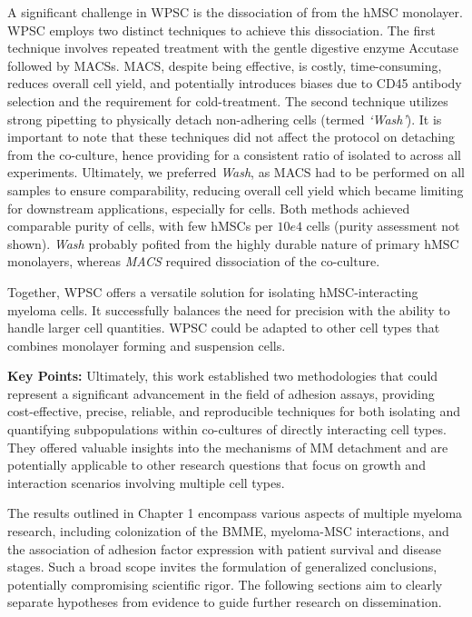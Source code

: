 A significant challenge in \ac{WPSC} is the dissociation of \MAina from the hMSC
monolayer. WPSC employs two distinct techniques to achieve this dissociation.
The first technique involves repeated treatment with the gentle digestive enzyme
Accutase followed by \acp{MACS}. \ac{MACS}, despite being effective, is costly,
time-consuming, reduces overall cell yield, and potentially introduces biases
due to CD45 antibody selection and the requirement for cold-treatment. The
second technique utilizes strong pipetting to physically detach non-adhering
cells (termed \emph{`Wash'}). It is important to note that these techniques did
not affect the protocol on detaching \nMAina from the co-culture, hence
providing for a consistent ratio of isolated \MAina to \nMAina across all
experiments. Ultimately, we preferred \emph{Wash}, as \ac{MACS} had to be performed
on all samples to ensure comparability, reducing overall cell yield which became
limiting for downstream applications, especially for \nMAina cells. Both methods
achieved comparable purity of \MAina cells, with few hMSCs per $10e4$
\MAina cells (purity assessment not shown). \emph{Wash} probably pofited from
the highly durable nature of primary hMSC monolayers, whereas \emph{MACS}
required dissociation of the co-culture.

Together, \ac{WPSC} offers a versatile solution for isolating hMSC-interacting
myeloma cells. It successfully balances the need for precision with the ability
to handle larger cell quantities. \ac{WPSC} could be adapted to other cell types
that combines monolayer forming and suspension cells.



\textbf{Key Points:} Ultimately, this work established two methodologies
that could represent a significant advancement in the field of adhesion assays,
providing cost-effective, precise, reliable, and reproducible techniques for
both isolating and quantifying subpopulations within co-cultures of directly
interacting cell types. They offered valuable insights into the mechanisms of MM
detachment and are potentially applicable to other research questions that focus
on growth and interaction scenarios involving multiple cell types.








%
\label{sec:discussion_framework}%
The results outlined in Chapter 1 encompass various aspects of multiple myeloma
research, including colonization of the \ac{BMME}, myeloma-\ac{MSC}
interactions, and the association of adhesion factor expression with patient
survival and disease stages. Such a broad scope invites the formulation of
generalized conclusions, potentially compromising scientific rigor. The
following sections aim to clearly separate hypotheses from evidence to guide
further research on dissemination.

